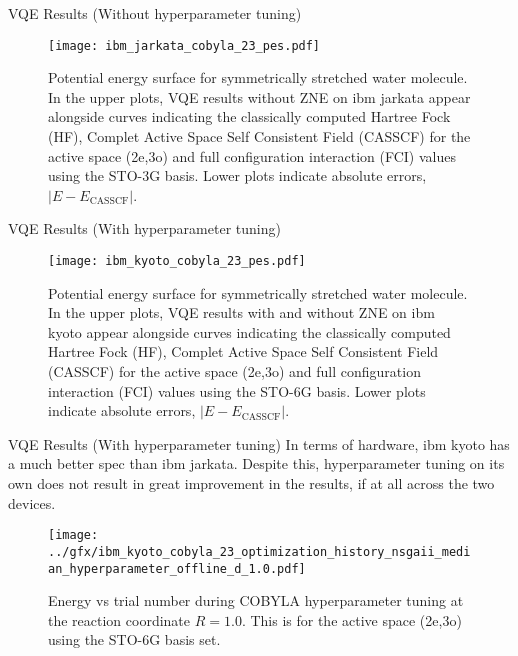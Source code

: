 \begin{frame}{VQE Results (Without hyperparameter tuning)}
    \begin{figure}
      \centering
      \texttt{[image: ibm\_jarkata\_cobyla\_23\_pes.pdf]}
      \caption{
        Potential energy surface for symmetrically stretched water molecule. In
        the upper plots, VQE results without ZNE on ibm jarkata appear
        alongside curves indicating the classically computed Hartree Fock (HF),
        Complet Active Space Self Consistent Field (CASSCF) for the active
        space (2e,3o) and full configuration interaction (FCI) values using the STO-3G basis.
        Lower plots indicate absolute errors, $|E − E_\text{CASSCF}|$.
      }
    \end{figure}
\end{frame}

\begin{frame}{VQE Results (With hyperparameter tuning)}
    \begin{figure}
      \centering
      \texttt{[image: ibm\_kyoto\_cobyla\_23\_pes.pdf]}
      \caption{
        Potential energy surface for symmetrically stretched water molecule. In
        the upper plots, VQE results with and without ZNE on ibm kyoto appear
        alongside curves indicating the classically computed Hartree Fock (HF),
        Complet Active Space Self Consistent Field (CASSCF) for the active
        space (2e,3o) and full configuration interaction (FCI) values using the STO-6G basis.
        Lower plots indicate absolute errors, $|E − E_\text{CASSCF}|$.
      }
    \end{figure}
\end{frame}


\begin{frame}{VQE Results (With hyperparameter tuning)}
  In terms of hardware, ibm kyoto has a much better spec than ibm jarkata.
  Despite this, hyperparameter tuning on its own does not result in great
  improvement in the results, if at all across the two devices.

  \begin{figure}
      \centering
      \texttt{[image: ../gfx/ibm\_kyoto\_cobyla\_23\_optimization\_history\_nsgaii\_median\_hyperparameter\_offline\_d\_1.0.pdf]}
      \caption{Energy vs trial number during COBYLA hyperparameter tuning at the reaction coordinate $R = 1.0$. This is for the active space (2e,3o) using the STO-6G basis set.}
  \end{figure}
\end{frame}


